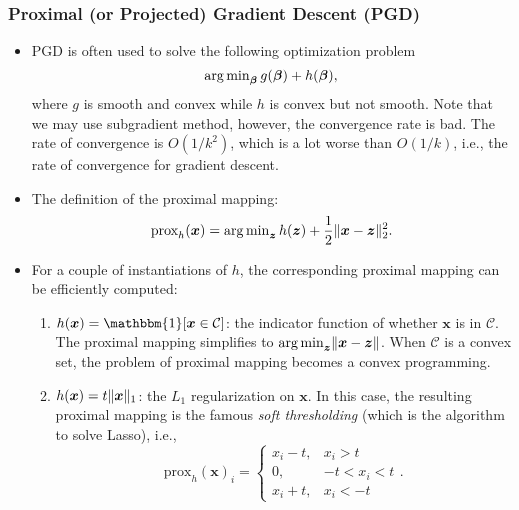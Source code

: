     \subsubsection{Proximal (or Projected) Gradient Descent (PGD)}
    \begin{itemize}
        \item PGD is often used to solve the following optimization problem
            \begin{equation}\label{PGD}
                \operatorname{arg\,min}_{\bm{\beta}} g(\bm{\beta}) + h(\bm{\beta}),
            \end{equation}
        where $g$ is smooth and convex while $h$ is convex but not smooth.  
        Note that we may use subgradient method, however, the convergence rate is bad.
        The rate of convergence is $O(1/k^2)$, which is a lot worse than $O(1/k)$, i.e., the rate of convergence for gradient descent.
        \item The definition of the proximal mapping:
            \begin{equation}
                \text{prox}_h(\bm{x}) = \operatorname{arg\,min}_{\bm{z}} h(\bm{z}) + \frac{1}{2}\lVert\bm{x} - \bm{z}\rVert^2_2.
            \end{equation}
        \item For a couple of instantiations of $h$, the corresponding proximal mapping can be efficiently computed:
            \begin{enumerate}
                \item $h(\bm{x}) = \mathbbm{1}[\bm{x} \in \mathcal{C}]$: the indicator function of whether $\bm{x}$ is in $\mathcal{C}$. The proximal mapping simplifies to $\operatorname{arg\,min}_{\bm{z}}\lVert\bm{x} - \bm{z}\rVert$. When $\mathcal{C}$ is a convex set, the problem of proximal mapping becomes a convex programming.
                \item $h(\bm{x}) = t \lVert\bm{x}\rVert_1$: the $L_1$ regularization on $\bm{x}$. In this case, the resulting proximal mapping is the famous \emph{soft thresholding} (which is the algorithm to solve Lasso), i.e., 
                    \begin{equation}
                        \text{prox}_h(\bm{x})_i = \begin{cases}
                            x_i - t,&  x_i > t \\
                            0, & -t < x_i < t \\
                            x_i + t, & x_i < -t
                        \end{cases}.
                    \end{equation}
            \end{enumerate}
            

\end{itemize}
